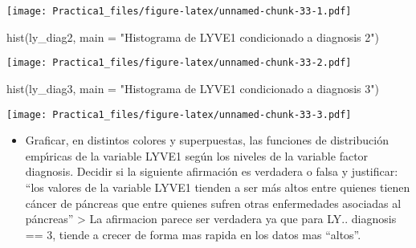 \documentclass[
]{article}
\newenvironment{Shaded}{\begin{snugshade}}{\end{snugshade}}
\newcommand{\AttributeTok}[1]{\textcolor[rgb]{0.77,0.63,0.00}{#1}}
\newcommand{\DecValTok}[1]{\textcolor[rgb]{0.00,0.00,0.81}{#1}}
\newcommand{\FunctionTok}[1]{\textcolor[rgb]{0.00,0.00,0.00}{#1}}
\newcommand{\NormalTok}[1]{#1}
\newcommand{\OtherTok}[1]{\textcolor[rgb]{0.56,0.35,0.01}{#1}}
\newcommand{\SpecialCharTok}[1]{\textcolor[rgb]{0.00,0.00,0.00}{#1}}
\newcommand{\StringTok}[1]{\textcolor[rgb]{0.31,0.60,0.02}{#1}}
\providecommand{\tightlist}{%
  \setlength{\itemsep}{0pt}\setlength{\parskip}{0pt}}
\begin{document}
\begin{Shaded}
\end{Shaded}

\texttt{[image: Practica1\_files/figure-latex/unnamed-chunk-33-1.pdf]}

\begin{Shaded}
\begin{Highlighting}[]
\FunctionTok{hist}\NormalTok{(ly\_diag2, }\AttributeTok{main =} \StringTok{"Histograma de LYVE1 condicionado a diagnosis 2"}\NormalTok{)}
\end{Highlighting}
\end{Shaded}

\texttt{[image: Practica1\_files/figure-latex/unnamed-chunk-33-2.pdf]}

\begin{Shaded}
\begin{Highlighting}[]
\FunctionTok{hist}\NormalTok{(ly\_diag3, }\AttributeTok{main =} \StringTok{"Histograma de LYVE1 condicionado a diagnosis 3"}\NormalTok{)}
\end{Highlighting}
\end{Shaded}

\texttt{[image: Practica1\_files/figure-latex/unnamed-chunk-33-3.pdf]}

\begin{itemize}
\tightlist
\item
  Graficar, en distintos colores y superpuestas, las funciones de
  distribución empı́ricas de la variable LYVE1 según los niveles de la
  variable factor diagnosis. Decidir si la siguiente afirmación es
  verdadera o falsa y justificar: ``los valores de la variable LYVE1
  tienden a ser más altos entre quienes tienen cáncer de páncreas que
  entre quienes sufren otras enfermedades asociadas al páncreas''
  \textgreater{} La afirmacion parece ser verdadera ya que para LY..
  diagnosis == 3, tiende a crecer de forma mas rapida en los datos mas
  ``altos''.
\end{itemize}
\end{document}
